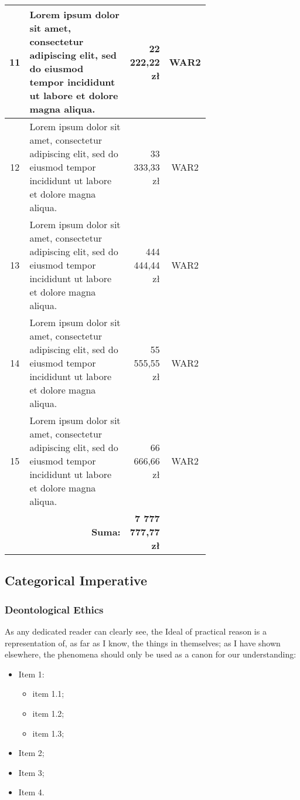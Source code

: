 \begin{longtable}{| c | m{0.58\linewidth} | r | m{0.1\linewidth} |}
    11 & Lorem ipsum dolor sit amet, consectetur adipiscing elit, sed do eiusmod tempor incididunt ut labore et dolore magna aliqua. & 22 222,22 zł               & \multicolumn{1}{c|}{WAR2}                          \\ \hline
    12 & Lorem ipsum dolor sit amet, consectetur adipiscing elit, sed do eiusmod tempor incididunt ut labore et dolore magna aliqua. & 33 333,33 zł               & \multicolumn{1}{c|}{WAR2}                          \\ \hline
    13 & Lorem ipsum dolor sit amet, consectetur adipiscing elit, sed do eiusmod tempor incididunt ut labore et dolore magna aliqua. & 444 444,44 zł              & \multicolumn{1}{c|}{WAR2}                          \\ \hline
    14 & Lorem ipsum dolor sit amet, consectetur adipiscing elit, sed do eiusmod tempor incididunt ut labore et dolore magna aliqua. & 55 555,55 zł               & \multicolumn{1}{c|}{WAR2}                          \\ \hline
    15 & Lorem ipsum dolor sit amet, consectetur adipiscing elit, sed do eiusmod tempor incididunt ut labore et dolore magna aliqua. & 66 666,66 zł               & \multicolumn{1}{c|}{WAR2}                          \\ \hline
       & \multicolumn{1}{r|}{\textbf{Suma:}}                                                                                         & \textbf{7 777 777,77 zł}   &
\end{longtable}
\kant[4]

\subsection{Categorical Imperative}
\subsubsection{Deontological Ethics}
As any dedicated reader can clearly see, the Ideal of practical reason is a representation of, as far as I know, the things in themselves; as I have shown elsewhere, the phenomena should only be used as a canon for our understanding:
\begin{itemize}
    \item Item 1:
          \begin{itemize}[label=---]
              \item item 1.1;
              \item item 1.2;
              \item item 1.3;
          \end{itemize}
    \item Item 2;
    \item Item 3;
    \item Item 4.
\end{itemize}
\kant[2]

